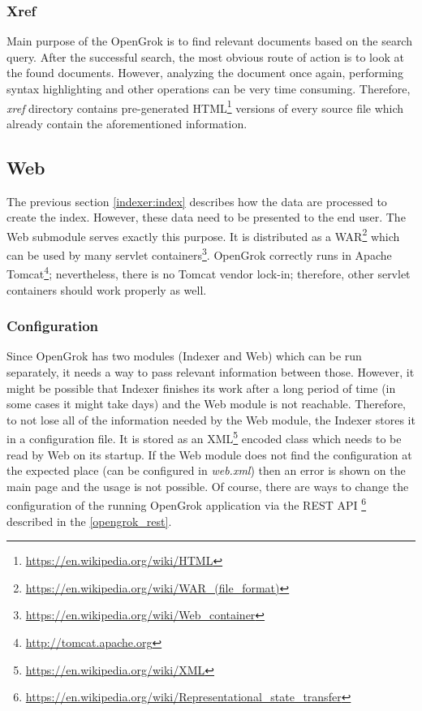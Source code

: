 \subsubsection{Xref}
\label{indexer:xref}

Main purpose of the OpenGrok is to find relevant documents based on the search query. After the successful search, the most
obvious route of action is to look at the found documents. However, analyzing the document once again, performing syntax
highlighting and other operations can be very time consuming. Therefore, \textit{xref} directory contains pre-generated
HTML\footnote{\url{https://en.wikipedia.org/wiki/HTML}} versions of every source file which already contain the
aforementioned information.

\subsection{Web}
\label{opengrok-web}

The previous section \ref{indexer:index} describes how the data are processed to create the index. However, these data need
to be presented to the end user. The Web submodule serves exactly this purpose. It is distributed as a
WAR\footnote{\url{https://en.wikipedia.org/wiki/WAR\_(file\_format)}} which can be used by many
servlet containers\footnote{\url{https://en.wikipedia.org/wiki/Web\_container}}. OpenGrok correctly runs in
Apache Tomcat\footnote{\url{http://tomcat.apache.org}}; nevertheless, there is no Tomcat vendor lock-in; therefore,
other servlet containers should work properly as well.

\subsubsection{Configuration}
\label{opengrok_configuration}

Since OpenGrok has two modules (Indexer and Web) which can be run separately, it needs a way to pass relevant
information between those. However, it might be possible that Indexer finishes its work after a long period of time
(in some cases it might take days) and the Web module is not reachable. Therefore, to not lose all of the information
needed by the Web module, the Indexer stores it in a configuration file. It is stored as an
XML\footnote{\url{https://en.wikipedia.org/wiki/XML}} encoded class which needs to be read by Web on its startup.
If the Web module does not find the configuration at the expected place (can be configured in \textit{web.xml}) then an
error is shown on the main page and the usage is not possible. Of course, there are ways to change the configuration
of the running OpenGrok application via the REST API \footnote{\url{https://en.wikipedia.org/wiki/Representational\_state\_transfer}}
described in the \ref{opengrok_rest}.

